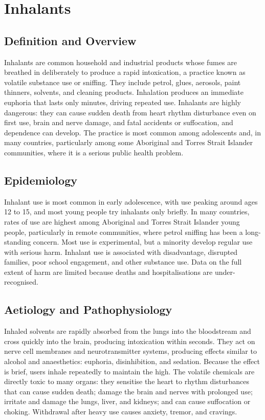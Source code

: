 \chapter{Inhalants}

\section*{Definition and Overview}
Inhalants are common household and industrial products whose fumes are breathed in deliberately to produce a rapid intoxication, a practice known as volatile substance use or sniffing. They include petrol, glues, aerosols, paint thinners, solvents, and cleaning products. Inhalation produces an immediate euphoria that lasts only minutes, driving repeated use. Inhalants are highly dangerous: they can cause sudden death from heart rhythm disturbance even on first use, brain and nerve damage, and fatal accidents or suffocation, and dependence can develop. The practice is most common among adolescents and, in many countries, particularly among some Aboriginal and Torres Strait Islander communities, where it is a serious public health problem.

\section*{Epidemiology}
Inhalant use is most common in early adolescence, with use peaking around ages 12 to 15, and most young people try inhalants only briefly. In many countries, rates of use are highest among Aboriginal and Torres Strait Islander young people, particularly in remote communities, where petrol sniffing has been a long-standing concern. Most use is experimental, but a minority develop regular use with serious harm. Inhalant use is associated with disadvantage, disrupted families, poor school engagement, and other substance use. Data on the full extent of harm are limited because deaths and hospitalisations are under-recognised.

\section*{Aetiology and Pathophysiology}
Inhaled solvents are rapidly absorbed from the lungs into the bloodstream and cross quickly into the brain, producing intoxication within seconds. They act on nerve cell membranes and neurotransmitter systems, producing effects similar to alcohol and anaesthetics: euphoria, disinhibition, and sedation. Because the effect is brief, users inhale repeatedly to maintain the high. The volatile chemicals are directly toxic to many organs: they sensitise the heart to rhythm disturbances that can cause sudden death; damage the brain and nerves with prolonged use; irritate and damage the lungs, liver, and kidneys; and can cause suffocation or choking. Withdrawal after heavy use causes anxiety, tremor, and cravings.

